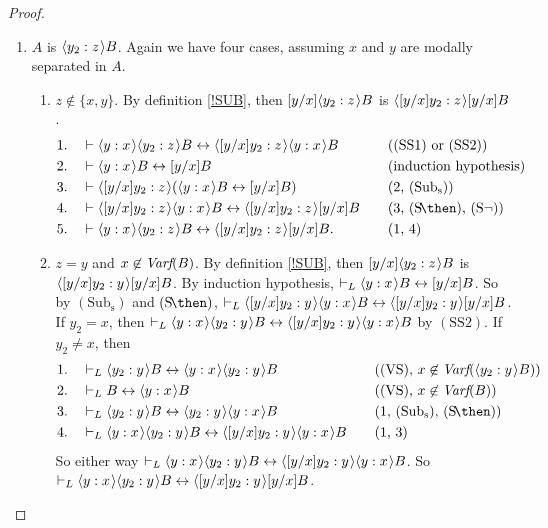 \documentclass[11pt]{woarticle}
\newcommand{\cmnt}[1]{\iffalse #1 \fi}
\theoremstyle{break}
\theoremstyle{nonumberplain}
\newcommand{\1}{\;\,|\;\,}
\newcommand{\fvar}{\emph{Varf}}
\renewcommand{\t}[1]{\ensuremath{\langle #1  \makebox[.2ex]{}\rangle}}
\newcommand{\T}[1]{\ensuremath{(\mathrm{ #1})}}
\begin{document}
\begin{proof}
\begin{enumerate}
  \item $A$ is $\t{y_2:z}B$.\; Again we have four cases, assuming $x$
    and $y$ are modally separated in $A$.
    \begin{enumerate}
    \item $z \not\in \{x,y\}$.\; By definition \ref{!SUB}, then
      $[y/x]\t{y_2:z}B$ is $\t{[y/x]y_2:z}[y/x]B$. 
      \begin{alignat*}{2}
      1.\quad&\vdash \t{y:x}\t{y_2:z}B \leftrightarrow \t{[y/x]y_2:z}\t{y:x}B
         &\quad&\text{(\T{SS1} or \T{SS2})}\\
      2.\quad&\vdash \t{y:x}B \leftrightarrow [y/x]B
         &\quad&\text{(induction hypothesis)}\\
      3.\quad&\vdash \t{[y/x]y_2:z}(\t{y:x}B \leftrightarrow [y/x]B)
         &\quad&\text{(2, \T{Sub_s})}\\
      4.\quad&\vdash \t{[y/x]y_2:z}\t{y:x}B \leftrightarrow \t{[y/x]y_2:z}[y/x]B
         &\quad&\text{(3, \T{S\!\then}, \T{S\neg})}\\
      5.\quad&\vdash \t{y:x}\t{y_2:z}B \leftrightarrow \t{[y/x]y_2:z}[y/x]B.
         &\quad&\text{(1, 4)}
      \end{alignat*}

    \item $z=y$ and $x\not\in \fvar(B)$.\; By definition \ref{!SUB},
      then $[y/x]\t{y_2:z} B$ is $\t{[y/x]y_2:y}[y/x]B$. By induction
      hypothesis, $\vdash_L \t{y:x}B \leftrightarrow [y/x]B$. So by
      \T{Sub_s} and \T{S\!\then}, $\vdash_L \t{[y/x]y_2:y}\t{y:x}B
      \leftrightarrow \t{[y/x]y_2:y}[y/x]B$. If $y_2=x$, then
      $\vdash_L \t{y:x}\t{y_2:y}B \leftrightarrow
      \t{[y/x]y_2:y}\t{y:x}B$ by \T{SS2}. \cmnt{I.e. $\vdash_L
        \t{y:x}\t{x:y}B \leftrightarrow \t{y:y}\t{y:x}B$.} If
      $y_2\not=x$, then
      \begin{alignat*}{2}
        1.\quad& \vdash_L \t{y_2:y}B \leftrightarrow \t{y:x}\t{y_2:y}B
               &\quad&\text{(\T{VS}, $x\not\in \fvar(\t{y_2:y}B)$)}\\
        2.\quad& \vdash_L B \leftrightarrow \t{y:x}B
               &&\text{(\T{VS}, $x\not\in \fvar(B)$)}\\
        3.\quad& \vdash_L \t{y_2:y}B \leftrightarrow \t{y_2:y}\t{y:x}B
               &&\text{(1, \T{Sub_s}, \T{S\!\then})}\\
        4.\quad& \vdash_L \t{y:x}\t{y_2:y}B \leftrightarrow \t{[y/x]y_2:y}\t{y:x}B
               &&\text{(1, 3)}
      \end{alignat*}
      So either way $\vdash_L \t{y:x}\t{y_2:y}B \leftrightarrow
      \t{[y/x]y_2:y}\t{y:x}B$. So $\vdash_L \t{y:x}\t{y_2:y}B
      \leftrightarrow \t{[y/x]y_2:y}[y/x]B$.
 

\end{enumerate}
\end{enumerate}
\end{proof}
\end{document}

